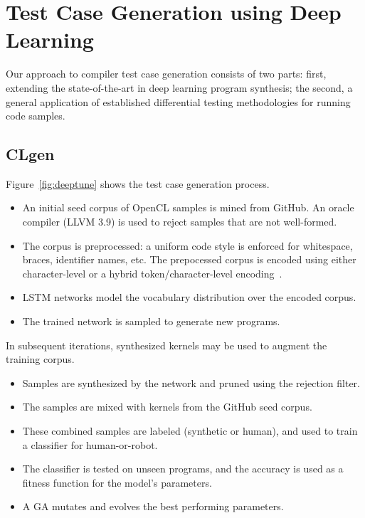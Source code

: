 \section{Test Case Generation using Deep Learning}

Our approach to compiler test case generation consists of two parts: first, extending the state-of-the-art in deep learning program synthesis; the second, a general application of established differential testing methodologies for running code samples.


\subsection{CLgen}

Figure~\ref{fig:deeptune} shows the test case generation process.

\begin{itemize}
\item An initial seed corpus of OpenCL samples is mined from GitHub. An oracle compiler (LLVM 3.9) is used to reject samples that are not well-formed.
\item The corpus is preprocessed: a uniform code style is enforced for whitespace, braces, identifier names, etc. The prepocessed corpus is encoded using either character-level or a hybrid token/character-level encoding~\cite{Cummins2017b}.
\item LSTM networks model the vocabulary distribution over the encoded corpus.
\item The trained network is sampled to generate new programs.
\end{itemize}

\noindent In subsequent iterations, synthesized kernels may be used to augment the training corpus.

\begin{itemize}
\item Samples are synthesized by the network and pruned using the rejection filter.
\item The samples are mixed with kernels from the GitHub seed corpus.
\item These combined samples are labeled (synthetic or human), and used to train a classifier for human-or-robot.
\item The classifier is tested on unseen programs, and the accuracy is used as a fitness function for the model's parameters.
\item A GA mutates and evolves the best performing parameters.
\end{itemize}


